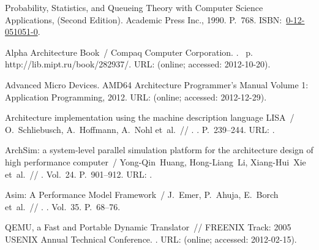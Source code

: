 \begin{thebibliography}{10}
 {Probability, Statistics, and Queueing Theory with
  Computer Science Applications, (Second Edition)}. \BibDash
\newblock Academic Press Inc., 1990. \BibDash
\newblock P.~768. \BibDash
\newblock
  ISBN:~\href{http://isbndb.com/search-all.html?kw=0-12-051051-0}{0-12-051051-0}.

Alpha Architecture Book~/ Compaq Computer Cor\-po\-ra\-tion. \BibDash
{}. \BibDash
{}~p. \BibDash
\newblock http://lib.mipt.ru/book/282937/. URL:
   (online; accessed: 2012-10-20).

Advanced Micro Devices. \BibDash
\newblock AMD64 Architecture Programmer’s Manual Volume 1: Application
  Programming, 2012. \BibDash
\newblock URL:
  (online; accessed: 2012-12-29).

{Architecture implementation using the machine description language {LISA}}~/
  O.~Schliebusch, A.~Hoffmann, A.~Nohl et~al.~// .
  \BibDash
{}. \BibDash
\newblock P.~239–244. \BibDash
\newblock URL:
  .

{ArchSim: a system-level parallel simulation platform for the architecture
  design of high performance computer}~/ Yong-Qin~Huang, Hong-Liang~Li,
  Xiang-Hui~Xie et~al.~//
  \href{http://dx.doi.org/10.1007/s11390-009-9281-9}{} \BibDash
{}. \BibDash
\newblock Vol.~24. \BibDash
\newblock P.~901–912. \BibDash
\newblock URL: .

{Asim: A Performance Model Framework}~/ J.~Emer, P.~Ahuja, E.~Borch et~al.~//
  \href{http://dx.doi.org/10.1109/2.982918}{}. \BibDash
{}. \BibDash
\newblock Vol.~35. \BibDash
\newblock P.~68–76.

 {{QEMU}, a Fast and Portable Dynamic Translator}~//
  {FREENIX Track: 2005 USENIX Annual Technical Conference}. \BibDash
{}. \BibDash
\newblock URL:
  (online; accessed: 2012-02-15).


\end{thebibliography}
